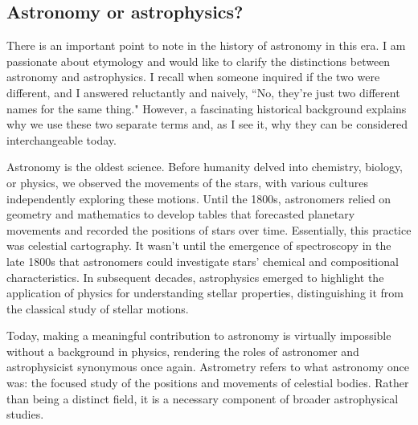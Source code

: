 \subsection{Astronomy or astrophysics?}
There is an important point to note in the history of astronomy in this era. I am passionate about etymology and would like to clarify the distinctions between astronomy and astrophysics. I recall when someone inquired if the two were different, and I answered reluctantly and naively, “No, they're just two different names for the same thing." However, a fascinating historical background explains why we use these two separate terms and, as I see it, why they can be considered interchangeable today. 

Astronomy is the oldest science. Before humanity delved into chemistry, biology, or physics, we observed the movements of the stars, with various cultures independently exploring these motions. Until the 1800s, astronomers relied on geometry and mathematics to develop tables that forecasted planetary movements and recorded the positions of stars over time. Essentially, this practice was celestial cartography. It wasn't until the emergence of spectroscopy in the late 1800s that astronomers could investigate stars' chemical and compositional characteristics. In subsequent decades, astrophysics emerged to highlight the application of physics for understanding stellar properties, distinguishing it from the classical study of stellar motions.

Today, making a meaningful contribution to astronomy is virtually impossible without a background in physics, rendering the roles of astronomer and astrophysicist synonymous once again. Astrometry refers to what astronomy once was: the focused study of the positions and movements of celestial bodies. Rather than being a distinct field, it is a necessary component of broader astrophysical studies. 

